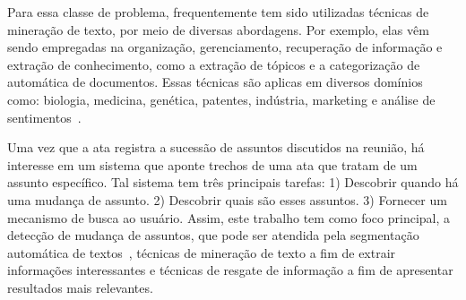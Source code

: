 
Para essa classe de problema, frequentemente tem sido utilizadas técnicas de mineração de texto, por meio de diversas abordagens. Por exemplo, elas  vêm sendo empregadas na organização, gerenciamento, recuperação de informação e extração de conhecimento, como a extração de tópicos e a categorização de automática de documentos. Essas técnicas são aplicas em diversos domínios como: biologia, medicina, genética, patentes, indústria, marketing e análise de sentimentos~\cite{Hashimi2015729}. %




Uma vez que a ata registra a sucessão de assuntos discutidos na reunião, há interesse em um sistema que aponte trechos de uma ata que tratam de um assunto específico. Tal sistema tem três principais tarefas: 1) Descobrir quando há uma mudança de assunto. 2) Descobrir quais são esses assuntos. 3) Fornecer um mecanismo de busca ao usuário. Assim, este trabalho tem como foco principal, a detecção de mudança de assuntos, que pode ser atendida pela segmentação automática de textos~\cite{Chen2017,Naili2016,Cardoso2017}, técnicas de mineração de texto a fim de extrair informações interessantes e técnicas de resgate de informação a fim de apresentar resultados mais relevantes. 




